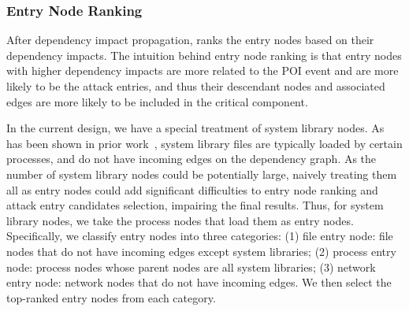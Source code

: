 \subsubsection{Entry Node Ranking}
\label{subsubsec:entry-ranking}
After dependency impact propagation, \tool ranks the entry nodes
based on their dependency impacts.
%
The intuition behind entry node ranking is that entry nodes with higher dependency impacts are more related to the POI event and are more likely to be the attack entries, and thus their 
descendant nodes and associated edges are more likely to be included in the critical component.
%

In the current design, we have a special treatment of system library nodes. 
As has been shown in prior work~\cite{reduction2}, system library files are typically loaded by certain processes, and do not have incoming edges on the dependency graph.
As the number of system library nodes could be potentially large, naively treating them all as entry nodes could add significant difficulties to entry node ranking and attack entry candidates selection, impairing the final results.
Thus, for system library nodes, we take the process nodes that load them as entry nodes.
%
Specifically, 
we classify entry nodes into three categories: (1) file entry node: file nodes that do not have incoming edges except system libraries; (2) process entry node: process nodes whose parent nodes are all system libraries; (3) network entry node: network nodes that do not have incoming edges. 
We then select the top-ranked entry nodes from each category.








